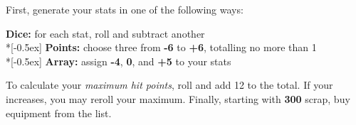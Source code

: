 
First, generate your stats in one of the following ways:

\textbf{Dice:} for each stat, roll  and subtract another  \\*[-0.5ex]
\textbf{Points:} choose three from \textbf{-6} to \textbf{+6}, totalling no more than 1 \\*[-0.5ex]
\textbf{Array:} assign \textbf{-4}, \textbf{0}, and \textbf{+5} to your stats

To calculate your \emph{maximum hit points}, roll  and add 12 to the total. If your  increases, you may reroll your maximum. Finally, starting with \textbf{300} scrap, buy equipment from the list.
